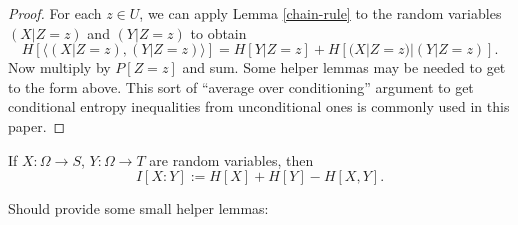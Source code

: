 \begin{proof}  For each $z \in U$, we can apply Lemma \ref{chain-rule} to the random variables $(X|Z=z)$ and $(Y|Z=z)$ to obtain
$$ H[ \langle (X|Z=z),(Y|Z=z) \rangle ] = H[Y|Z=z] + H[(X|Z=z)|(Y|Z=z)].$$
Now multiply by $P[Z=z]$ and sum.  Some helper lemmas may be needed to get to the form above.  This sort of ``average over conditioning'' argument to get conditional entropy inequalities from unconditional ones is commonly used in this paper.
\end{proof}

\begin{definition}\label{information-def} If $X: \Omega \to S$, $Y: \Omega \to T$ are random variables, then
  $$ I[ X : Y ] := H[X] + H[Y] - H[X,Y].$$
\end{definition}

Should provide some small helper lemmas:
